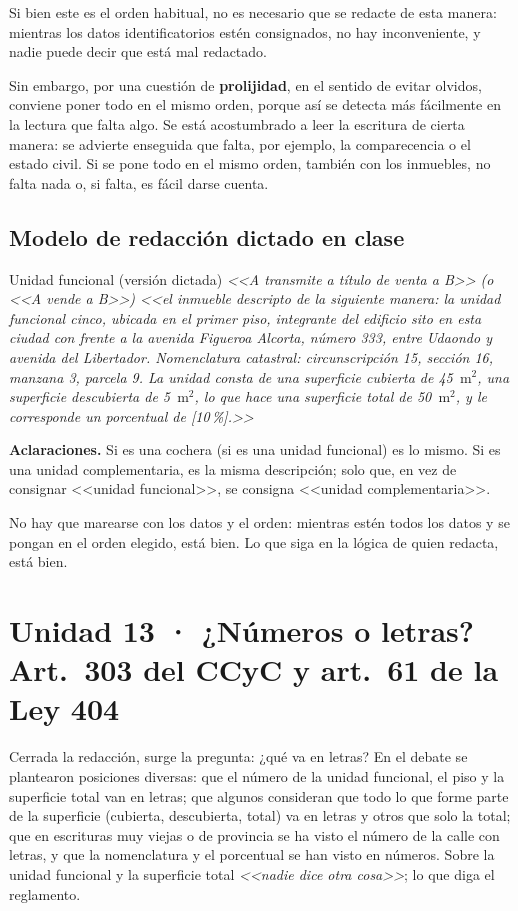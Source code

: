 \documentclass[12pt,oneside]{book}
\newcommand{\mcuad}{$\mathrm{m}^2$}
\begin{document}
Si bien este es el orden habitual, no es necesario que se redacte de esta manera: mientras los datos identificatorios estén consignados, no hay inconveniente, y nadie puede decir que está mal redactado.

Sin embargo, por una cuestión de \textbf{prolijidad}, en el sentido de evitar olvidos, conviene poner todo en el mismo orden, porque así se detecta más fácilmente en la lectura que falta algo. Se está acostumbrado a leer la escritura de cierta manera: se advierte enseguida que falta, por ejemplo, la comparecencia o el estado civil. Si se pone todo en el mismo orden, también con los inmuebles, no falta nada o, si falta, es fácil darse cuenta.

\subsection{Modelo de redacción dictado en clase}

\begin{example}{Unidad funcional (versión dictada)}
\textit{<<A transmite a título de venta a B>> (o <<A vende a B>>) <<el inmueble descripto de la siguiente manera: la unidad funcional cinco, ubicada en el primer piso, integrante del edificio sito en esta ciudad con frente a la avenida Figueroa Alcorta, número 333, entre Udaondo y avenida del Libertador. Nomenclatura catastral: circunscripción 15, sección 16, manzana 3, parcela 9. La unidad consta de una superficie cubierta de 45~\mcuad, una superficie descubierta de 5~\mcuad, lo que hace una superficie total de 50~\mcuad, y le corresponde un porcentual de [10\,\%].>>}
\end{example}

\textbf{Aclaraciones.} Si es una cochera (si es una unidad funcional) es lo mismo. Si es una unidad complementaria, es la misma descripción; solo que, en vez de consignar <<unidad funcional>>, se consigna <<unidad complementaria>>.

No hay que marearse con los datos y el orden: mientras estén todos los datos y se pongan en el orden elegido, está bien. Lo que siga en la lógica de quien redacta, está bien.

\section{Unidad 13 · ¿Números o letras? Art.~303 del CCyC y art.~61 de la Ley 404}

Cerrada la redacción, surge la pregunta: ¿qué va en letras? En el debate se plantearon posiciones diversas: que el número de la unidad funcional, el piso y la superficie total van en letras; que algunos consideran que todo lo que forme parte de la superficie (cubierta, descubierta, total) va en letras y otros que solo la total; que en escrituras muy viejas o de provincia se ha visto el número de la calle con letras, y que la nomenclatura y el porcentual se han visto en números. Sobre la unidad funcional y la superficie total \textit{<<nadie dice otra cosa>>}; lo que diga el reglamento.
\end{document}
